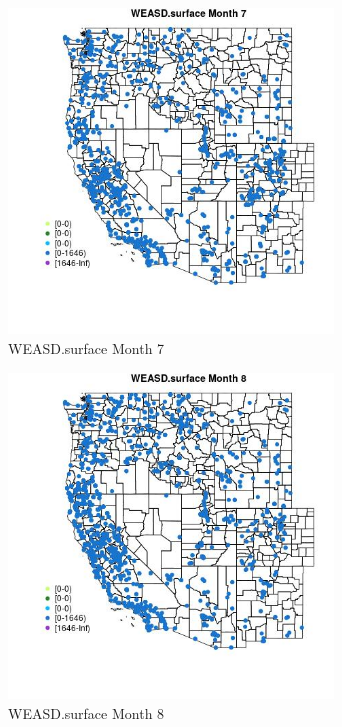 \begin{figure} 
\centering  
\includegraphics[width=0.77\textwidth]{Code_Outputs/Report_ML_input_PM25_Step4_part_f_de_duplicated_aves_prioritize_24hr_obswNAs_MapObsMo7WEASDsurface.jpg} 
\caption{\label{fig:Report_ML_input_PM25_Step4_part_f_de_duplicated_aves_prioritize_24hr_obswNAsMapObsMo7WEASDsurface}WEASD.surface Month 7} 
\end{figure} 
 

\begin{figure} 
\centering  
\includegraphics[width=0.77\textwidth]{Code_Outputs/Report_ML_input_PM25_Step4_part_f_de_duplicated_aves_prioritize_24hr_obswNAs_MapObsMo8WEASDsurface.jpg} 
\caption{\label{fig:Report_ML_input_PM25_Step4_part_f_de_duplicated_aves_prioritize_24hr_obswNAsMapObsMo8WEASDsurface}WEASD.surface Month 8} 
\end{figure} 
 

